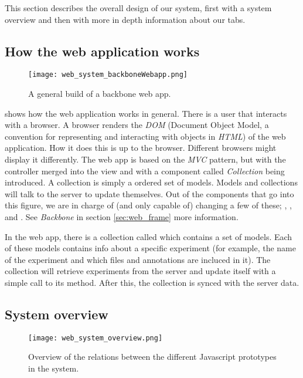 This section describes the overall design of our system, first with a system overview and then with more in depth information about our tabs.
\subsection{How the web application works}
\begin{figure}[h!]
\centering
\texttt{[image: web\_system\_backboneWebapp.png]}
\caption{\footnotesize A general build of a backbone web app.}
\label{fig:web_system_backboneWebapp}
\end{figure}

 shows how the web application works in general. There is a user that interacts with a browser. A browser renders the \textit{DOM} (Document Object Model, a convention for representing and interacting with objects in \textit{HTML}) of the web application. How it does this is up to the browser. Different browsers might display it differently. The web app is based on the \textit{MVC} pattern, but with the controller merged into the view and with a component called \textit{Collection} being introduced. A collection is simply a ordered set of models. Models and collections will talk to the server to update themselves. Out of the components that go into this figure, we are in charge of (and only capable of) changing a few of these; , ,  and . See \textit{Backbone} in section \ref{sec:web_frame} more information. 
\pagebreak
\begin{example}
In the web app, there is a collection called  which contains a set of  models. Each of these models contains info about a specific experiment (for example, the name of the experiment and which files and annotations are incluced in it). The collection will retrieve experiments from the server and update itself with a simple call to its  method. After this, the collection is synced with the server data.
\end{example}

\subsection{System overview}
\begin{figure}[h!]
\centering
\texttt{[image: web\_system\_overview.png]}
\caption{\footnotesize Overview of the relations between the different Javascript prototypes in the system.}
\label{fig:web_system_overview}
\end{figure}


